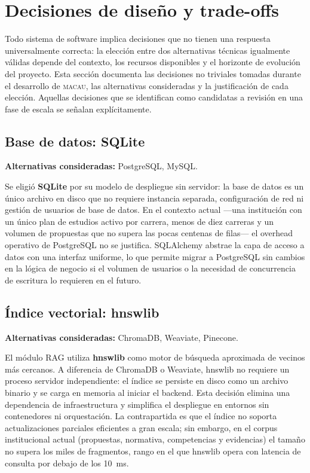 \section{Decisiones de diseño y trade-offs}
\label{sec:decisiones_disenio}

Todo sistema de software implica decisiones que no tienen una respuesta
universalmente correcta: la elección entre dos alternativas técnicas
igualmente válidas depende del contexto, los recursos disponibles y el
horizonte de evolución del proyecto.
Esta sección documenta las decisiones no triviales tomadas durante el
desarrollo de \textsc{macau}, las alternativas consideradas y la
justificación de cada elección.
Aquellas decisiones que se identifican como candidatas a revisión
en una fase de escala se señalan explícitamente.

\subsection*{Base de datos: SQLite}

\textbf{Alternativas consideradas:} PostgreSQL, MySQL.

Se eligió \textbf{SQLite} por su modelo de despliegue sin servidor: la
base de datos es un único archivo en disco que no requiere instancia
separada, configuración de red ni gestión de usuarios de base de datos.
En el contexto actual —una institución con un único plan de estudios
activo por carrera, menos de diez carreras y un volumen de propuestas que no supera
las pocas centenas de filas— el overhead operativo de PostgreSQL no
se justifica.
SQLAlchemy abstrae la capa de acceso a datos con una interfaz uniforme,
lo que permite migrar a PostgreSQL sin cambios en la lógica de negocio
si el volumen de usuarios o la necesidad de concurrencia de escritura lo
requieren en el futuro.

\subsection*{Índice vectorial: hnswlib}

\textbf{Alternativas consideradas:} ChromaDB, Weaviate, Pinecone.

El módulo RAG utiliza \textbf{hnswlib} como motor de búsqueda aproximada
de vecinos más cercanos.
A diferencia de ChromaDB o Weaviate, hnswlib no requiere un proceso
servidor independiente: el índice se persiste en disco como un archivo
binario y se carga en memoria al iniciar el backend.
Esta decisión elimina una dependencia de infraestructura y simplifica
el despliegue en entornos sin contenedores ni orquestación.
La contrapartida es que el índice no soporta actualizaciones parciales
eficientes a gran escala; sin embargo, en el corpus institucional actual
(propuestas, normativa, competencias y evidencias) el tamaño no supera
los miles de fragmentos, rango en el que hnswlib opera con latencia
de consulta por debajo de los 10~ms.

